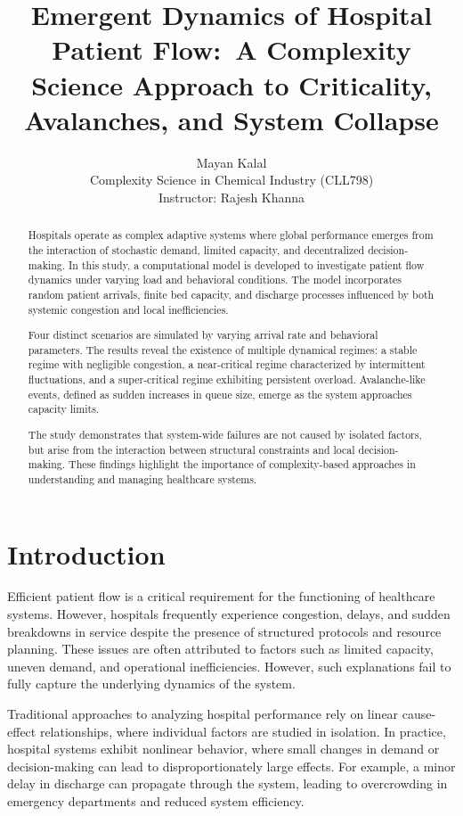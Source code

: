 \documentclass[11pt]{article}
\title{\textbf{Emergent Dynamics of Hospital Patient Flow:\
A Complexity Science Approach to Criticality, Avalanches, and System Collapse}}
\author{
Mayan Kalal\\
Complexity Science in Chemical Industry (CLL798) \\
Instructor: Rajesh Khanna
}
\date{}
\begin{document}
\maketitle

\begin{abstract}
Hospitals operate as complex adaptive systems where global performance emerges from the interaction of stochastic demand, limited capacity, and decentralized decision-making. In this study, a computational model is developed to investigate patient flow dynamics under varying load and behavioral conditions. The model incorporates random patient arrivals, finite bed capacity, and discharge processes influenced by both systemic congestion and local inefficiencies.

Four distinct scenarios are simulated by varying arrival rate and behavioral parameters. The results reveal the existence of multiple dynamical regimes: a stable regime with negligible congestion, a near-critical regime characterized by intermittent fluctuations, and a super-critical regime exhibiting persistent overload. Avalanche-like events, defined as sudden increases in queue size, emerge as the system approaches capacity limits.

The study demonstrates that system-wide failures are not caused by isolated factors, but arise from the interaction between structural constraints and local decision-making. These findings highlight the importance of complexity-based approaches in understanding and managing healthcare systems.
\end{abstract}

\section{Introduction}

Efficient patient flow is a critical requirement for the functioning of healthcare systems. However, hospitals frequently experience congestion, delays, and sudden breakdowns in service despite the presence of structured protocols and resource planning. These issues are often attributed to factors such as limited capacity, uneven demand, and operational inefficiencies. However, such explanations fail to fully capture the underlying dynamics of the system.

Traditional approaches to analyzing hospital performance rely on linear cause-effect relationships, where individual factors are studied in isolation. In practice, hospital systems exhibit nonlinear behavior, where small changes in demand or decision-making can lead to disproportionately large effects. For example, a minor delay in discharge can propagate through the system, leading to overcrowding in emergency departments and reduced system efficiency.
\end{document}
